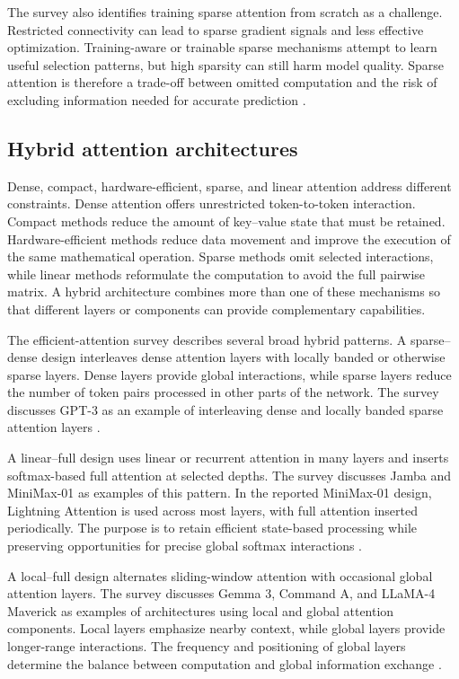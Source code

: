 The survey also identifies training sparse attention from scratch as
a challenge. Restricted connectivity can lead to sparse gradient
signals and less effective optimization. Training-aware or trainable
sparse mechanisms attempt to learn useful selection patterns, but
high sparsity can still harm model quality. Sparse attention is therefore
a trade-off between omitted computation and the risk of excluding
information needed for accurate prediction
\parencite{sun2026efficientattention}.

\subsection{Hybrid attention architectures}
\label{subsec:attn-hybrid-architectures}

Dense, compact, hardware-efficient, sparse, and linear attention
address different constraints. Dense attention offers unrestricted
token-to-token interaction. Compact methods reduce the amount of
key--value state that must be retained. Hardware-efficient methods
reduce data movement and improve the execution of the same mathematical
operation. Sparse methods omit selected interactions, while linear
methods reformulate the computation to avoid the full pairwise matrix.
A hybrid architecture combines more than one of these mechanisms so
that different layers or components can provide complementary
capabilities.

The efficient-attention survey describes several broad hybrid patterns.
A sparse--dense design interleaves dense attention layers with locally
banded or otherwise sparse layers. Dense layers provide global
interactions, while sparse layers reduce the number of token pairs
processed in other parts of the network. The survey discusses GPT-3
as an example of interleaving dense and locally banded sparse attention
layers \parencite{sun2026efficientattention}.

A linear--full design uses linear or recurrent attention in many layers
and inserts softmax-based full attention at selected depths. The survey
discusses Jamba and MiniMax-01 as examples of this pattern. In the
reported MiniMax-01 design, Lightning Attention is used across most
layers, with full attention inserted periodically. The purpose is to
retain efficient state-based processing while preserving opportunities
for precise global softmax interactions
\parencite{sun2026efficientattention}.

A local--full design alternates sliding-window attention with occasional
global attention layers. The survey discusses Gemma 3, Command A, and
LLaMA-4 Maverick as examples of architectures using local and global
attention components. Local layers emphasize nearby context, while
global layers provide longer-range interactions. The frequency and
positioning of global layers determine the balance between computation
and global information exchange \parencite{sun2026efficientattention}.

